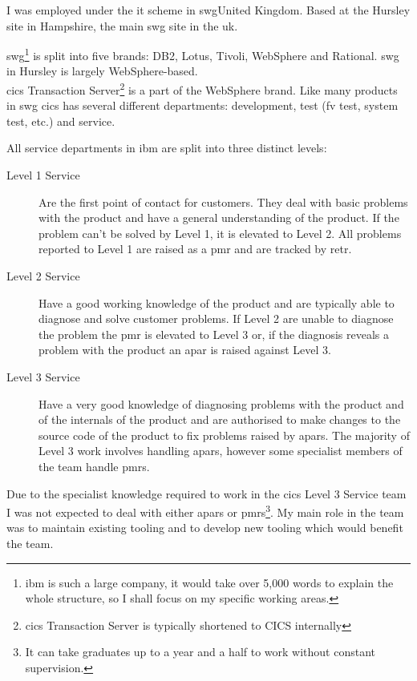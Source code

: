 \documentclass[a4paper,11pt]{report}
\begin{document}
I was employed under the \gls{it} scheme in \gls{swg}{United Kingdom}. Based at the Hursley site in 
Hampshire, the main \gls{swg} site in the \gls{uk}.

\Gls{swg}\footnote{\gls{ibm} is such a large company, it would take over 5,000 words to explain the
whole structure, so I shall focus on my specific working areas.} is split into five brands: DB2, 
Lotus, Tivoli, WebSphere and Rational. \Gls{swg} in Hursley is largely WebSphere-based. \\



\Gls{cics} Transaction Server\footnote{\Gls{cics} Transaction Server is typically shortened to CICS
internally} is a part of the WebSphere brand. Like many products in \gls{swg} \gls{cics} has 
several different departments: development, test (\gls{fv} test, system test, etc.) and service.

All service departments in \gls{ibm} are split into three distinct levels:

\begin{description}
\item[Level 1 Service] Are the first point of contact for customers. They deal with basic problems
with the product and have a general understanding of the product. If the problem can't be solved by
Level 1, it is elevated to Level 2. All problems reported to Level 1 are raised as a \gls{pmr} and
are tracked by \gls{retr}.
\item[Level 2 Service] Have a good working knowledge of the product and are typically able to 
diagnose and solve customer problems. If Level 2 are unable to diagnose the problem the \gls{pmr}
is elevated to Level 3 or, if the diagnosis reveals a problem with the product an \gls{apar} is
raised against Level 3. 
\item[Level 3 Service] Have a very good knowledge of diagnosing problems with the product and of
the internals of the product and are authorised to make changes to the source code of the product
to fix problems raised by \gls{apar}s. The majority of Level 3 work involves handling \gls{apar}s,
however some specialist members of the team handle \gls{pmr}s.
\end{description}

Due to the specialist knowledge required to work in the \gls{cics} Level 3 Service team I was not
expected to deal with either \gls{apar}s or \gls{pmr}s\footnote{It can take graduates up to a year
and a half to work without constant supervision.}. My main role in the team was to maintain 
existing tooling and to develop new tooling which would benefit the team. \\
\end{document}
